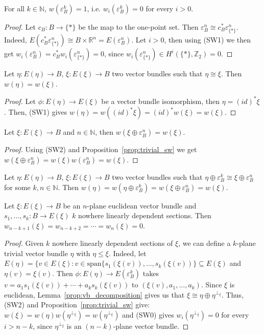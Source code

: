 \begin{proposition}\label{prop:trivial_sw} For all $k\in\mathbb{N}$, $w(\varepsilon_B^k)=1$, i.e. $w_i(\varepsilon_B^k)=0$ for every $i>0$.
\end{proposition}
\begin{proof} Let $c_B:B\to\{*\}$ be the map to the one-point set. Then $\varepsilon_B^n\cong c_B^*\varepsilon_{\{*\}}^n$. Indeed, $E(c_B^*\varepsilon_{\{*\}}^n)\cong B\times\mathbb{R}^n=E(\varepsilon_B^n)$. Let $i>0$, then using (SW1) we then get $w_i(\varepsilon_B^n)=c_B^*w_i(\varepsilon_{\{*\}}^n)=0$, since $w_i(\varepsilon_{\{*\}}^n)\in H^i(\{*\},\mathbb{Z}_2)=0$.
\end{proof}

\begin{proposition} Let $\eta:E(\eta)\to B$, $\xi:E(\xi)\to B$ two vector bundles such that $\eta\cong\xi$. Then $w(\eta)=w(\xi)$.
\end{proposition}
\begin{proof} Let $\phi:E(\eta)\to E(\xi)$ be a vector bundle isomorphism, then $\eta=(id)^*\xi$. Then, (SW1) gives $w(\eta)=w((id)^*\xi)=(id)^*w(\xi)=w(\xi)$.
\end{proof}

\begin{proposition} Let $\xi:E(\xi)\to B$ and $n\in\mathbb{N}$, then $w(\xi\oplus\varepsilon_B^n)=w(\xi)$.
\end{proposition}
\begin{proof} Using (SW2) and Proposition~\ref{prop:trivial_sw} we get $w(\xi\oplus\varepsilon_B^n)=w(\xi)w(\varepsilon_B^n)=w(\xi)$.
\end{proof}

\begin{corollary} Let $\eta:E(\eta)\to B$, $\xi:E(\xi)\to B$ two vector bundles such that $\eta\oplus\varepsilon_B^k\cong\xi\oplus\varepsilon_B^n$ for some $k,n\in\mathbb{N}$. Then $w(\eta)=w(\eta\oplus\varepsilon_B^k)=w(\xi\oplus\varepsilon_B^n)=w(\xi)$.
\end{corollary}

\begin{proposition} Let $\xi:E(\xi)\to B$ be an $n$-plane euclidean vector bundle and $s_1,\ldots,s_k:B\to E(\xi)$ $k$ nowhere linearly dependent sections. Then $w_{n-k+1}(\xi)=w_{n-k+2}=\cdots=w_n(\xi)=0$.
\end{proposition}
\begin{proof} Given $k$ nowhere linearly dependent sections of $\xi$, we can define a $k$-plane trivial vector bundle $\eta$ with $\eta\leq\xi$. Indeed, let $E(\eta)=\big\{v\in E(\xi):v\in\mathrm{span}\{s_1(\xi(v)),\ldots,s_k(\xi(v))\}\subseteq E(\xi)$ and $\eta(v)=\xi(v)$. Then $\phi:E(\eta)\to E(\varepsilon_B^k)$ takes $v=a_1s_1(\xi(v))+\cdots+a_ks_k(\xi(v))$ to $(\xi(v),a_1,\ldots,a_k)$. Since $\xi$ is euclidean, Lemma~\ref{prop:vb_decomposition} gives us that $\xi\cong\eta\oplus\eta^{\perp_{\xi}}$. Thus, (SW2) and Proposition~\ref{prop:trivial_sw} give: $w(\xi)=w(\eta)w(\eta^{\perp_{\xi}})=w(\eta^{\perp_{\xi}})$ and (SW0) gives $w_i(\eta^{\perp_{\xi}})=0$ for every $i>n-k$, since $\eta^{\perp_{\xi}}$ is an $(n-k)$-plane vector bundle.
\end{proof}


